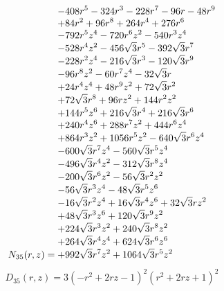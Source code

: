 \documentclass[11pt,a4paper]{article}
\begin{document}
\begin{equation}
N_{35}(r,z)=\shortstack[l]{$\displaystyle  - 408 r^{5} - 324 r^{3} - 228 r^{7} - 96 r - 48 r^{9}$\\
$\displaystyle  + 84 r^{2} + 96 r^{8} + 264 r^{4} + 276 r^{6}$\\
$\displaystyle  - 792 r^{5} z^{4} - 720 r^{6} z^{2} - 540 r^{3} z^{4}$\\
$\displaystyle  - 528 r^{4} z^{2} - 456 \sqrt{3} r^{5} - 392 \sqrt{3} r^{7}$\\
$\displaystyle  - 228 r^{2} z^{4} - 216 \sqrt{3} r^{3} - 120 \sqrt{3} r^{9}$\\
$\displaystyle  - 96 r^{8} z^{2} - 60 r^{7} z^{4} - 32 \sqrt{3} r$\\
$\displaystyle  + 24 r^{4} z^{4} + 48 r^{9} z^{2} + 72 \sqrt{3} r^{2}$\\
$\displaystyle  + 72 \sqrt{3} r^{8} + 96 r z^{2} + 144 r^{2} z^{2}$\\
$\displaystyle  + 144 r^{5} z^{6} + 216 \sqrt{3} r^{4} + 216 \sqrt{3} r^{6}$\\
$\displaystyle  + 240 r^{4} z^{6} + 288 r^{7} z^{2} + 444 r^{6} z^{4}$\\
$\displaystyle  + 864 r^{3} z^{2} + 1056 r^{5} z^{2} - 640 \sqrt{3} r^{6} z^{4}$\\
$\displaystyle  - 600 \sqrt{3} r^{7} z^{4} - 560 \sqrt{3} r^{5} z^{4}$\\
$\displaystyle  - 496 \sqrt{3} r^{4} z^{2} - 312 \sqrt{3} r^{8} z^{4}$\\
$\displaystyle  - 200 \sqrt{3} r^{6} z^{2} - 56 \sqrt{3} r^{2} z^{2}$\\
$\displaystyle  - 56 \sqrt{3} r^{3} z^{4} - 48 \sqrt{3} r^{5} z^{6}$\\
$\displaystyle  - 16 \sqrt{3} r^{2} z^{4} + 16 \sqrt{3} r^{4} z^{6} + 32 \sqrt{3} r z^{2}$\\
$\displaystyle  + 48 \sqrt{3} r^{3} z^{6} + 120 \sqrt{3} r^{9} z^{2}$\\
$\displaystyle  + 224 \sqrt{3} r^{3} z^{2} + 240 \sqrt{3} r^{8} z^{2}$\\
$\displaystyle  + 264 \sqrt{3} r^{4} z^{4} + 624 \sqrt{3} r^{6} z^{6}$\\
$\displaystyle  + 992 \sqrt{3} r^{7} z^{2} + 1064 \sqrt{3} r^{5} z^{2}$}
\label{eq:cat-numerator-35}
\end{equation}
\begin{equation}
D_{35}(r,z)=3 \left(- r^{2} + 2 r z - 1\right)^{2} \left(r^{2} + 2 r z + 1\right)^{2}
\label{eq:cat-denominator-35}
\end{equation}
\end{document}
